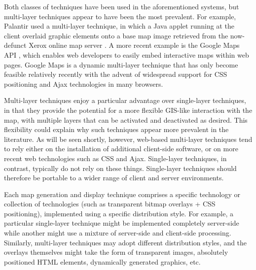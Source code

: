 \documentclass[acmnow]{acmtrans2m}
\begin{document}
Both classes of techniques have been used in the aforementioned systems,
but multi-layer techniques appear to have been the most prevalent. For
example, Palantir used a multi-layer technique, in which a Java applet
running at the client overlaid graphic elements onto a base map image
retrieved from the now-defunct Xerox online map server
\cite{Papa-N-1998-Palantir}. A more recent example is the Google Maps
API \cite{Goog-M-2006-maps}, which enables web developers to easily
embed interactive maps within web pages. Google Maps is a dynamic
multi-layer technique that has only become feasible relatively recently
with the advent of widespread support for CSS positioning and Ajax
technologies \cite{Garr-JJ-2005-Ajax} in many browsers.

Multi-layer techniques enjoy a particular advantage over single-layer
techniques, in that they provide the potential for a more flexible
GIS-like interaction with the map, with multiple layers that can be
activated and deactivated as desired. This flexibility could explain why
such techniques appear more prevalent in the literature. As will be seen
shortly, however, web-based multi-layer techniques tend to rely either
on the installation of additional client-side software, or on more
recent web technologies such as CSS and Ajax. Single-layer techniques,
in contrast, typically do not rely on these things. Single-layer
techniques should therefore be portable to a wider range of client and
server environments.

Each map generation and display technique comprises a specific
technology or collection of technologies (such as transparent bitmap
overlays + CSS positioning), implemented using a specific distribution
style. For example, a particular single-layer technique might be
implemented completely server-side while another might use a mixture of
server-side and client-side processing. Similarly, multi-layer
techniques may adopt different distribution styles, and the overlays
themselves might take the form of transparent images, absolutely
positioned HTML elements, dynamically generated graphics, etc.
\end{document}
